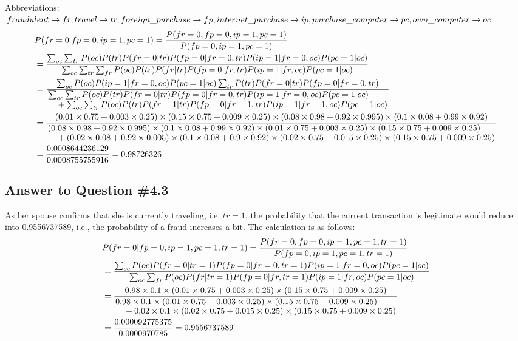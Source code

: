 \documentclass[conference]{styles/acmsiggraph}
\begin{document}
Abbreviations: $fraudulent \to fr, travel \to tr, foreign\_purchase \to fp,internet\_purchase \to ip, \\ purchase\_computer \to pc, own\_computer \to oc$
\begin{equation}
	\begin{aligned}
		& P(fr=0|fp=0, ip=1, pc=1) = \frac{P(fr=0, fp=0, ip=1, pc=1)}{P(fp=0, ip=1, pc=1)} \\
		& = \frac{\sum_{oc} \sum_{tr} P(oc)P(tr)P(fr=0|tr)P(fp=0|fr=0,tr)P(ip=1|fr=0,oc)P(pc=1|oc)}{\sum_{oc} \sum_{tr} \sum_{fr} P(oc)P(tr)P(fr|tr)P(fp=0|fr,tr)P(ip=1|fr,oc)P(pc=1|oc)} \\
		& = \frac{\sum_{oc} P(oc)P(ip=1|fr=0,oc)P(pc=1|oc) \sum_{tr} P(tr)P(fr=0|tr)P(fp=0|fr=0,tr)}{\splitfrac{\sum_{oc} \sum_{tr} P(oc)P(tr)P(fr=0|tr)P(fp=0|fr=0,tr)P(ip=1|fr=0,oc)P(pc=1|oc)}{+ \sum_{oc} \sum_{tr} P(oc)P(tr)P(fr=1|tr)P(fp=0|fr=1,tr)P(ip=1|fr=1,oc)P(pc=1|oc)}} \\
		& = \frac{(0.01\times0.75+0.003\times0.25)\times(0.15\times0.75+0.009\times0.25)\times(0.08 \times 0.98 +0.92 \times 0.995)\times(0.1 \times 0.08+0.99\times0.92)}{\splitfrac{(0.08 \times 0.98 +0.92 \times 0.995)\times(0.1 \times 0.08+0.99\times0.92)\times(0.01\times0.75+0.003\times0.25)\times(0.15\times0.75+0.009\times0.25)}{+(0.02 \times0.08+0.92\times0.005)\times(0.1\times0.08+0.9\times0.92)\times(0.02\times0.75+0.015\times0.25)\times(0.15\times0.75+0.009\times0.25)} } \\
		& = \frac{0.0008644236129}{0.0008755755916} = 0.98726326 \\
	\end{aligned}
\end{equation}

\subsection{Answer to Question \#4.3}
As her spouse confirms that she is currently traveling, i.e, $tr=1$, the probability that the current transaction is legitimate would reduce into 0.9556737589, i.e., the probability of a fraud increases a bit. The calculation is as follows:
\begin{equation}
	\begin{aligned}
		& P(fr=0|fp=0, ip=1, pc=1, tr=1) = \frac{P(fr=0, fp=0, ip=1, pc=1, tr=1)}{P(fp=0, ip=1, pc=1, tr=1)} \\
		& = \frac{\sum_{oc} P(oc)P(fr=0|tr=1)P(fp=0|fr=0,tr=1)P(ip=1|fr=0,oc)P(pc=1|oc)}{\sum_{oc} \sum_{fr} P(oc)P(fr|tr=1)P(fp=0|fr,tr=1)P(ip=1|fr,oc)P(pc=1|oc)} \\
		& = \frac{0.98\times0.1\times(0.01\times0.75+0.003\times0.25)\times(0.15\times0.75+0.009\times0.25)}{\splitfrac{0.98\times0.1\times(0.01\times0.75+0.003\times0.25)\times(0.15\times0.75+0.009\times0.25)}{+0.02\times0.1\times(0.02\times0.75+0.015\times0.25)\times(0.15\times0.75+0.009\times0.25)}} \\
		& =\frac{0.000092775375}{0.0000970785} = 0.9556737589 \\
	\end{aligned}
\end{equation}
\end{document}

